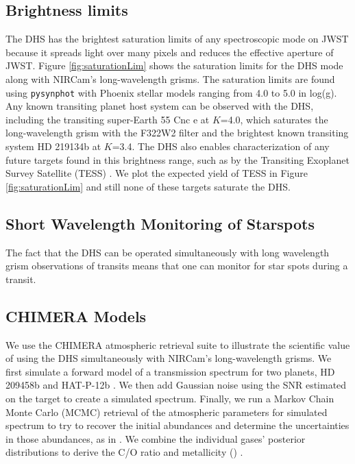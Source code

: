 \documentclass[iop]{emulateapj}
\begin{document}
\subsection{Brightness limits}\label{sec:brightness}

The DHS has the brightest saturation limits of any spectroscopic mode on JWST because it
spreads light over many pixels and reduces the effective aperture of JWST.
Figure \ref{fig:saturationLim} shows the saturation limits for the DHS mode along with NIRCam's long-wavelength grisms.
The saturation limits are found using \texttt{pysynphot} \citep{lim2015pysynphot} with Phoenix stellar models \citep{allard2012phoenix} ranging from 4.0 to 5.0 in log(g).
Any known transiting planet host system can be observed with the DHS, including the transiting super-Earth  55 Cnc e \citep{mcarthur2004disc55cnce} at $K$=4.0, which saturates the long-wavelength grism with the F322W2 filter and the brightest known transiting system HD 219134b \citep{motalebi2015hd219134b} at $K$=3.4.
The DHS also enables characterization of any future targets found in this brightness range, such as by the Transiting Exoplanet Survey Satellite (TESS) \citep{ricker2014tess}.
We plot the expected yield of TESS \citep{sullivan2015tess} in Figure \ref{fig:saturationLim} and still none of these targets saturate the DHS.

\subsection{Short Wavelength Monitoring of Starspots}
The fact that the DHS can be operated simultaneously with long wavelength grism observations of transits means that one can monitor for star spots during a transit.

\subsection{CHIMERA Models}\label{sec:models}

We use the CHIMERA atmospheric retrieval suite \citep{line2013chimera,line2014CtOsecE} to illustrate the scientific value of using the DHS simultaneously with NIRCam's long-wavelength grisms.
We first simulate a forward model of a transmission spectrum for two planets, HD 209458b \citep{henry00,charbonneau00} and HAT-P-12b \citep{hartman2009hatp12}.
We then add Gaussian noise using the SNR estimated on the target to create a simulated spectrum.
Finally, we run a Markov Chain Monte Carlo (MCMC) retrieval of the atmospheric parameters for simulated spectrum to try to recover the initial abundances and determine the uncertainties in those abundances, as in \citet{greene2016jwst_trans}.
We combine the individual gases' posterior distributions to derive the C/O ratio and metallicity (\citet{greene2016jwst_trans}) .
\end{document}
